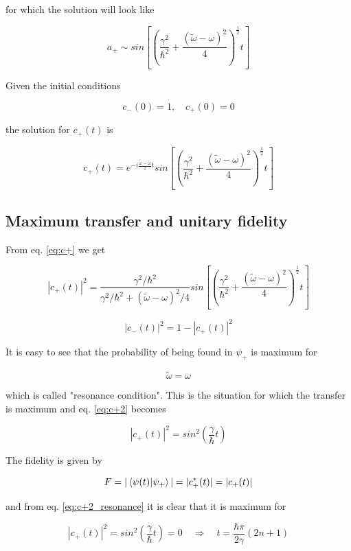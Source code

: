 \documentclass{article}
\begin{document}
for which the solution will look like

\begin{equation}
a_+ \sim sin \left[ \left( \frac{\gamma^2}{\hbar^2} + \frac{(\tilde{\omega}-\omega)^2}{4} \right)^{\frac{1}{2}} t \right]
\end{equation}

Given the initial conditions

\begin{equation}
c_-(0) = 1, \quad c_+(0) = 0
\end{equation}

the solution for \( c_+(t) \) is

\begin{equation}
\label{eq:c+}
c_+(t) = e^{-i \frac{\tilde{\omega}-\omega}{2}t} sin \left[ \left( \frac{\gamma^2}{\hbar^2} + \frac{(\tilde{\omega}-\omega)^2}{4} \right)^{\frac{1}{2}} t \right]
\end{equation}

\subsection{Maximum transfer and unitary fidelity}
From eq. \eqref{eq:c+} we get

\begin{equation}
\label{eq:c+2}
|c_+(t)|^2 = \frac{\gamma^2 / \hbar^2}{\gamma^2 / \hbar^2 + (\tilde{\omega}-\omega)^2/4} sin \left[ \left( \frac{\gamma^2}{\hbar^2} + \frac{(\tilde{\omega}-\omega)^2}{4} \right)^{\frac{1}{2}} t \right]
\end{equation}

\begin{equation}
|c_-(t)|^2 = 1 - |c_+(t)|^2 
\end{equation}

It is easy to see that the probability of being found in \( \psi_+ \) is maximum for

\begin{equation}
\tilde{\omega} = \omega
\end{equation}

which is called "resonance condition". This is the situation for which the transfer is maximum and eq. \eqref{eq:c+2} becomes

\begin{equation}
\label{eq:c+2_resonance}
|c_+(t)|^2 = sin^2\left(\frac{\gamma}{\hbar}t\right)
\end{equation}

The fidelity is given by

\begin{equation}
F = |\braket{\psi(t)}{\psi_+}| = |c_+^*(t)| = |c_+(t)|
\end{equation}

and from eq. \eqref{eq:c+2_resonance} it is clear that it is maximum for

\begin{equation}
|c_+(t)|^2 = sin^2\left(\frac{\gamma}{\hbar}t\right) = 0 \quad \Rightarrow \quad t = \frac{\hbar \pi}{2 \gamma} (2n +1)
\end{equation}
\end{document}
